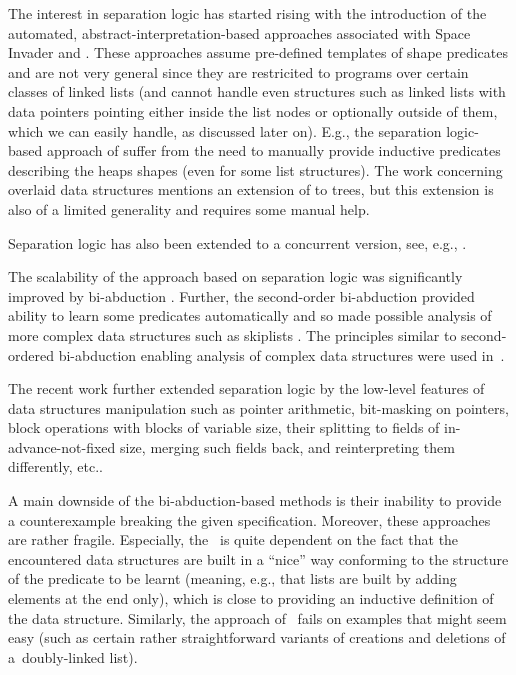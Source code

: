	  The interest in separation logic has started rising with the introduction of the automated,
	  abstract-interpretation-based approaches associated with Space Invader \cite{InvaderCAV08} and \slayer \cite{slayer11}.
          These approaches assume pre-defined templates of shape predicates and are not very general
          since they are restricited to programs over certain classes of linked lists (and cannot
          handle even structures such as linked lists with data
          pointers pointing either inside the list nodes or optionally outside of them,
          which we can easily handle, as discussed later on).
	  E.g., the separation logic-based approa\-ch of \cite{indPrSynt07} suffer from the need to manually provide inductive predicates
	  describing the heaps shapes (even for some list structures).
          The work \cite{overlaid11} concerning overlaid data
          structures mentions an extension of \spaceinvader to trees, but this extension
          is also of a limited generality and requires some manual help.

	  Separation logic has also been extended to a concurrent version, see, e.g., \cite{brookes16}.

	  The scalability of the approach based on separation logic was significantly improved by bi-abduction \cite{abduction11}.
	  Further, the second-order bi-abduction provided ability to learn some predicates automatically and so made possible analysis
	  of more complex data structures such as skiplists \cite{locle:secondorder}.
	  The principles similar to second-ordered bi-abduction enabling analysis of complex data structures
	  were used in~\cite{indPrSynt07}.

          The recent work \cite{soa-biabduction} further extended separation logic by the low-level features of data structures
          manipulation such as pointer arithmetic, bit-masking on pointers,
          block operations with blocks of variable size, their splitting to fields of in-advance-not-fixed size,
          merging such fields back, and reinterpreting them differently, etc..   

          A main downside of the bi-abduction-based methods is their inability to provide a counterexample breaking
	  the given specification.
          Moreover, these approaches are rather fragile. Especially, the~\cite{indPrSynt07}
          is quite dependent on the fact that the encountered
          data structures are built in a ``nice'' way conforming to the structure of the
          predicate to be learnt (meaning, e.g., that lists are built by adding elements
          at the end only), which is close to providing an inductive definition of the
          data structure. Similarly, the approach of \cite{locle:secondorder}~fails on examples that
          might seem easy (such as certain rather straightforward variants of creations
          and deletions of a~doubly-linked list).


